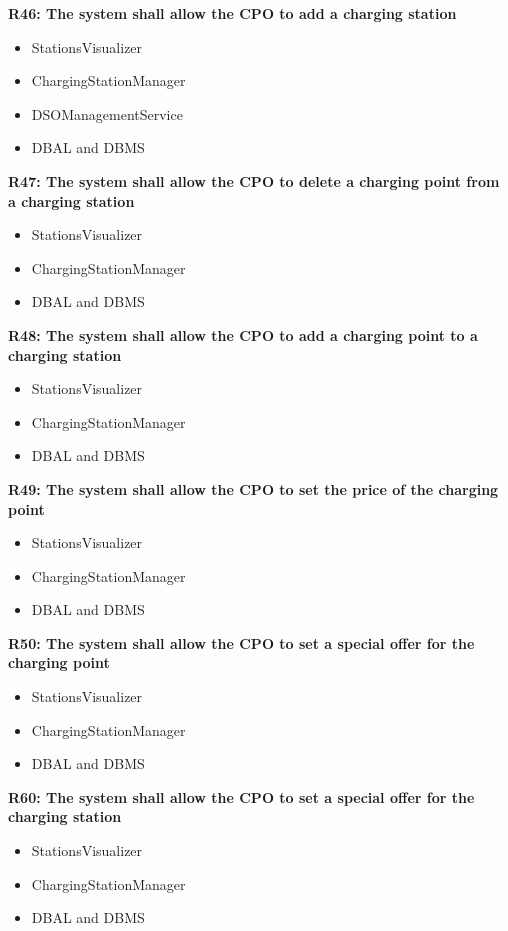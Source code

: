 \textbf{R46: The system shall allow the CPO to add a charging station}
\begin{itemize}
    \item StationsVisualizer
    \item ChargingStationManager
    \item DSOManagementService
    \item DBAL and DBMS
\end{itemize}

\textbf{R47: The system shall allow the CPO to delete a charging point from a charging station}
\begin{itemize}
    \item StationsVisualizer
    \item ChargingStationManager
    \item DBAL and DBMS
\end{itemize}

\textbf{R48: The system shall allow the CPO to add a charging point to a charging station}
\begin{itemize}
    \item StationsVisualizer
    \item ChargingStationManager
    \item DBAL and DBMS
\end{itemize}

\textbf{R49: The system shall allow the CPO to set the price of the charging point}
\begin{itemize}
    \item StationsVisualizer
    \item ChargingStationManager
    \item DBAL and DBMS
\end{itemize}

\textbf{R50: The system shall allow the CPO to set a special offer for the charging point}
\begin{itemize}
    \item StationsVisualizer
    \item ChargingStationManager
    \item DBAL and DBMS
\end{itemize}

\textbf{R60: The system shall allow the CPO to set a special offer for the charging station}
\begin{itemize}
    \item StationsVisualizer
    \item ChargingStationManager
    \item DBAL and DBMS
\end{itemize}
\vspace{1.5cm}

